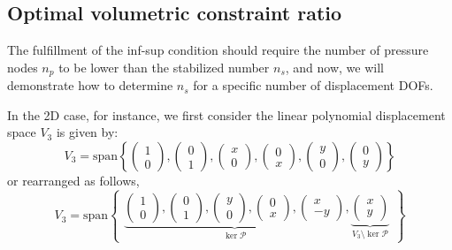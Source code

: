 \subsection{Optimal volumetric constraint ratio}
The fulfillment of the inf-sup condition should require the number of pressure nodes $n_p$ to be lower than the stabilized number $n_s$, and now, we will demonstrate how to determine $n_s$ for a specific number of displacement DOFs.

In the 2D case, for instance, we first consider the linear polynomial displacement space $V_3$ is given by:
\begin{equation}
V_3 = \mathrm{span} \left\{
\begin{pmatrix} 1 \\ 0 \end{pmatrix},
\begin{pmatrix} 0 \\ 1 \end{pmatrix},
\begin{pmatrix} x \\ 0 \end{pmatrix},
\begin{pmatrix} 0 \\ x \end{pmatrix},
\begin{pmatrix} y \\ 0 \end{pmatrix},
\begin{pmatrix} 0 \\ y \end{pmatrix}
\right\}
\end{equation}
or rearranged as follows,
\begin{equation}\label{base1}
V_3 = \mathrm{span}
\begin{Bmatrix}
\underbrace{
\begin{pmatrix} 1 \\ 0 \end{pmatrix},
\begin{pmatrix} 0 \\ 1 \end{pmatrix},
\begin{pmatrix} y \\ 0 \end{pmatrix},
\begin{pmatrix} 0 \\ x \end{pmatrix},
\begin{pmatrix} x \\ -y \end{pmatrix}
}_{\ker \mathcal{P}},
\underbrace{
\begin{pmatrix} x \\ y \end{pmatrix}
}_{V_3 \setminus \ker \mathcal{P}}
\end{Bmatrix}
\end{equation}
